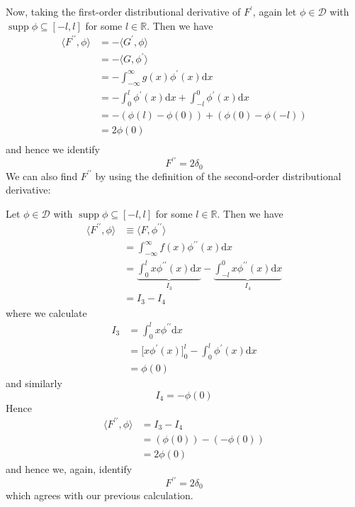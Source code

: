 \documentclass{article}
\DeclareMathOperator\supp{supp}
\begin{document}
Now, taking the first-order distributional derivative of $F^\prime$,
again let $\phi \in \mathcal{D}$ with $\supp \phi \subseteq [-l, l]$ for
some $l \in \mathbb{R}$. Then we have
%
\begin{align*}
    \langle F^{\prime \prime}, \phi \rangle
        &= - \langle G^\prime, \phi \rangle \\
        &= - \langle G, \phi^\prime \rangle \\
        &= - \int_{- \infty}^{\infty} g(x) \phi^\prime(x) \mathrm{d} x \\
        &= - \int_{0}^{l} \phi^\prime(x) \mathrm{d} x
            + \int_{-l}^{0} \phi^\prime(x) \mathrm{d} x \\
        &= - \left( \phi(l) - \phi(0) \right) + \left( \phi(0) - \phi(-l) \right) \\
        &= 2 \phi(0) \\
\end{align*}
%
and hence we identify
%
\begin{equation*}
    F^{\prime \prime} = 2 \delta_0
\end{equation*}
%
We can also find $F^{\prime \prime}$ by using the definition of the
second-order distributional derivative:

Let $\phi \in \mathcal{D}$ with $\supp \phi \subseteq [-l, l]$ for some
$l \in \mathbb{R}$. Then we have
%
\begin{align*}
    \langle F^{\prime \prime}, \phi \rangle
        &\equiv \langle F, \phi^{\prime \prime} \rangle \\
        &= \int_{- \infty}^{\infty} f(x) \phi^{\prime \prime}(x) \mathrm{d} x \\
        &= \underbrace{\int_{0}^{l} x \phi^{\prime \prime}(x) \mathrm{d} x}_{I_3}
            - \underbrace{\int_{-l}^{0} x \phi^{\prime \prime}(x) \mathrm{d} x}_{I_4} \\
        &= I_3 - I_4
\end{align*}
%
where we calculate
%
\begin{align*}
    I_3 &= \int_{0}^{l} x \phi^{\prime \prime} \mathrm{d} x \\
        &= \big[ x \phi^\prime(x) \big]_{0}^{l} - \int_{0}^{l} \phi^\prime(x) \mathrm{d} x \\
        &= \phi(0)
\end{align*}
%
and similarly
%
\begin{equation*}
    I_4 = - \phi(0)
\end{equation*}
%
Hence
%
\begin{align*}
    \langle F^{\prime \prime}, \phi \rangle
        &= I_3 - I_4 \\
        &= (\phi(0)) - (- \phi(0)) \\
        &= 2 \phi(0)
\end{align*}
%
and hence we, again, identify
%
\begin{equation*}
    F^{\prime \prime} = 2 \delta_0
\end{equation*}
%
which agrees with our previous calculation.
\end{document}
